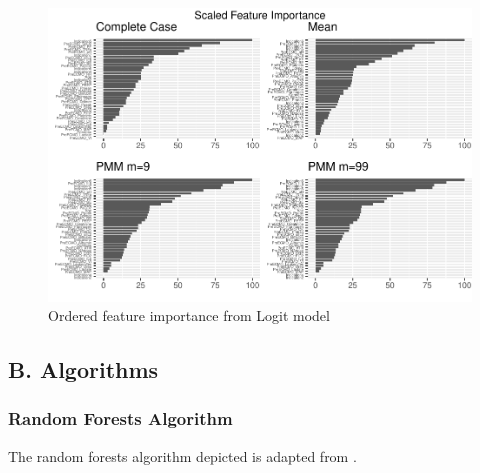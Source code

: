 \documentclass[12pt,]{article}
\begin{document}
\begin{figure}[H]

{\centering \includegraphics[width=1\linewidth]{figure/graphics-unnamed-chunk-13-1} 

}

\caption{\label{fig:feature-importance-logit}Ordered feature importance from Logit model}\label{fig:unnamed-chunk-13}
\end{figure}

\subsection{B. Algorithms}\label{b.-algorithms}

\subsubsection{Random Forests Algorithm}\label{random-forests-algorithm}

The random forests algorithm depicted is adapted from
\citep{hastie_elements_2009}.
\end{document}
